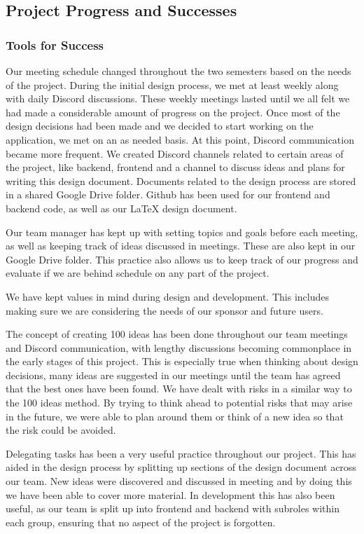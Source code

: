 \subsection{Project Progress and Successes}
\subsubsection{Tools for Success}
Our meeting schedule changed throughout the two semesters based on the needs of the project. During the initial design process, we met at least weekly along with daily Discord discussions. These weekly meetings lasted until we all felt we had made a considerable amount of progress on the project. Once most of the design decisions had been made and we decided to start working on the application, we met on an as needed basis. At this point, Discord communication became more frequent. We created Discord channels related to certain areas of the project, like backend, frontend and a channel to discuss ideas and plans for writing this design document. Documents related to the design process are stored in a shared Google Drive folder. Github has been used for our frontend and backend code, as well as our \LaTeX{} design document.\par
Our team manager has kept up with setting topics and goals before each meeting, as well as keeping track of ideas discussed in meetings. These are also kept in our Google Drive folder. This practice also allows us to keep track of our progress and evaluate if we are behind schedule on any part of the project.\par
We have kept values in mind during design and development. This includes making sure we are considering the needs of our sponsor and future users.\par
The concept of creating 100 ideas has been done throughout our team meetings and Discord communication, with lengthy discussions becoming commonplace in the early stages of this project. This is especially true when thinking about design decisions, many ideas are suggested in our meetings until the team has agreed that the best ones have been found. We have dealt with risks in a similar way to the 100 ideas method. By trying to think ahead to potential risks that may arise in the future, we were able to plan around them or think of a new idea so that the risk could be avoided.\par
Delegating tasks has been a very useful practice throughout our project. This has aided in the design process by splitting up sections of the design document across our team. New ideas were discovered and discussed in meeting and by doing this we have been able to cover more material. In development this has also been useful, as our team is split up into frontend and backend with subroles within each group, ensuring that no aspect of the project is forgotten.\par

